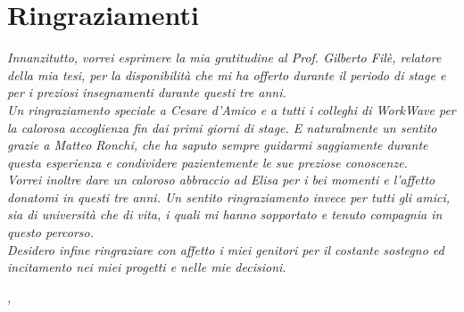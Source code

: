 
\cleardoublepage
{}
{}


\bigskip

\begingroup
\let\clearpage\relax
\let\cleardoublepage\relax
\let\cleardoublepage\relax

\chapter*{Ringraziamenti}

\noindent \textit{Innanzitutto, vorrei esprimere la mia gratitudine al Prof. Gilberto Filè, relatore della mia tesi, per la disponibilità che mi ha offerto durante il periodo di stage e per i preziosi insegnamenti durante questi tre anni.}\\

\noindent \textit{Un ringraziamento speciale a Cesare d'Amico e a tutti i colleghi di WorkWave per la calorosa accoglienza fin dai primi giorni di stage. E naturalmente un sentito grazie a Matteo Ronchi, che ha saputo sempre guidarmi saggiamente durante questa esperienza e condividere pazientemente le sue preziose conoscenze.}\\

\noindent \textit{Vorrei inoltre dare un caloroso abbraccio ad Elisa per i bei momenti e l'affetto donatomi in questi tre anni. Un sentito ringraziamento invece per tutti gli amici, sia di università che di vita, i quali mi hanno sopportato e tenuto compagnia in questo percorso.}\\

\noindent \textit{Desidero infine ringraziare con affetto i miei genitori per il costante sostegno ed incitamento nei miei progetti e nelle mie decisioni.}\\

\bigskip

\noindent\textit{\myLocation, \myTime}
\hfill \myName

\endgroup

